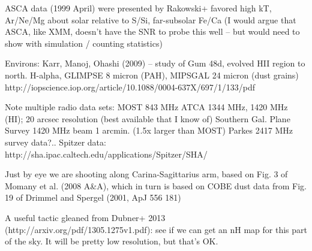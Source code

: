 \documentclass[twocolumn,tighten,trackchanges]{aastex6}
\begin{document}
ASCA data (1999 April) were presented by Rakowski+
favored high kT, Ar/Ne/Mg about solar relative to S/Si, far-subsolar Fe/Ca
(I would argue that ASCA, like XMM, doesn't have the SNR to probe this
well -- but would need to show with simulation / counting statistics)

Environs: Karr, Manoj, Ohashi (2009) -- study of Gum 48d, evolved HII region to
north.  H-alpha, GLIMPSE 8 micron (PAH), MIPSGAL 24 micron (dust grains)
http://iopscience.iop.org/article/10.1088/0004-637X/697/1/133/pdf

Note multiple radio data sets:
MOST 843 MHz
ATCA 1344 MHz, 1420 MHz (HI); 20 arcsec resolution (best available that I know of)
Southern Gal. Plane Survey 1420 MHz beam 1 arcmin. (1.5x larger than MOST)
Parkes 2417 MHz survey data?..
Spitzer data: http://sha.ipac.caltech.edu/applications/Spitzer/SHA/

Just by eye we are shooting along Carina-Sagittarius arm,
based on Fig. 3 of Momany et al. (2008 A\&A), which in turn is based on COBE
dust data from Fig. 19 of Drimmel and Spergel (2001, ApJ 556 181)

A useful tactic gleaned from Dubner+ 2013 (http://arxiv.org/pdf/1305.1275v1.pdf): see if
we can get an nH map for this part of the sky.
It will be pretty low resolution, but that's OK.

%
%
%
%
%
%
%

\end{document}
